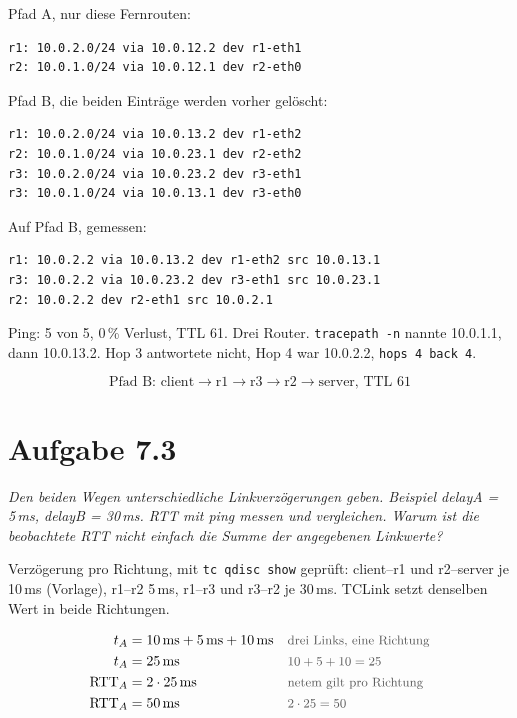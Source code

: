 \documentclass[a4paper,11pt]{article}
\newif\ifexplain
\newcommand{\aufgabe}[1]{\section*{Aufgabe #1}}
\newcommand{\angabe}[1]{{\raggedright\textit{#1}\par}\smallskip}
\newcommand{\why}[1]{\text{\small\color{black!65}#1}}
\newcommand{\explain}[1]{\ifexplain\begin{erklbox}#1\end{erklbox}\fi}
\begin{document}
Pfad A, nur diese Fernrouten:
\begin{lstlisting}
r1: 10.0.2.0/24 via 10.0.12.2 dev r1-eth1
r2: 10.0.1.0/24 via 10.0.12.1 dev r2-eth0
\end{lstlisting}

Pfad B, die beiden Einträge werden vorher gelöscht:
\begin{lstlisting}
r1: 10.0.2.0/24 via 10.0.13.2 dev r1-eth2
r2: 10.0.1.0/24 via 10.0.23.1 dev r2-eth2
r3: 10.0.2.0/24 via 10.0.23.2 dev r3-eth1
r3: 10.0.1.0/24 via 10.0.13.1 dev r3-eth0
\end{lstlisting}

\explain{Zwei statische Routen zum selben Präfix wären ECMP oder eine Metrikwahl. Die Angabe will nur einen aktiven Pfad. Deshalb steht in r1 immer genau ein Eintrag für 10.0.2.0/24. \texttt{ip route del} vor \texttt{replace} räumt einen alten Eintrag weg, falls das Präfix schon da ist.}

Auf Pfad B, gemessen:
\begin{lstlisting}
r1: 10.0.2.2 via 10.0.13.2 dev r1-eth2 src 10.0.13.1
r3: 10.0.2.2 via 10.0.23.2 dev r3-eth1 src 10.0.23.1
r2: 10.0.2.2 dev r2-eth1 src 10.0.2.1
\end{lstlisting}
Ping: 5 von 5, 0\,\% Verlust, TTL 61. Drei Router. \texttt{tracepath -n} nannte 10.0.1.1, dann 10.0.13.2. Hop 3 antwortete nicht, Hop 4 war 10.0.2.2, \texttt{hops 4 back 4}.

\explain{Hop 3 fehlt in der Ausgabe, die TTL nicht. 61 ist 64 minus 3. r2 hat den Probe nicht beantwortet, das Paket ist aber angekommen. Ein einzelner fehlender Hop ist kein Beweis für einen Abbruch, wenn Ping und TTL den dritten Router zeigen.}

\[
\boxed{\text{Pfad B: client}\to\text{r1}\to\text{r3}\to\text{r2}\to\text{server, TTL 61}}
\]

\aufgabe{7.3}
\angabe{Den beiden Wegen unterschiedliche Linkverzögerungen geben. Beispiel delayA = 5\,ms, delayB = 30\,ms. RTT mit ping messen und vergleichen. Warum ist die beobachtete RTT nicht einfach die Summe der angegebenen Linkwerte?}

Verzögerung pro Richtung, mit \texttt{tc qdisc show} geprüft: client--r1 und r2--server je 10\,ms (Vorlage), r1--r2 5\,ms, r1--r3 und r3--r2 je 30\,ms. TCLink setzt denselben Wert in beide Richtungen.

\begin{align*}
t_{A} &= 10\,\mathrm{ms}+5\,\mathrm{ms}+10\,\mathrm{ms} && \why{drei Links, eine Richtung}\\
t_{A} &= 25\,\mathrm{ms} && \why{$10+5+10=25$}\\
\mathrm{RTT}_{A} &= 2\cdot 25\,\mathrm{ms} && \why{netem gilt pro Richtung}\\
\mathrm{RTT}_{A} &= 50\,\mathrm{ms} && \why{$2\cdot 25=50$}
\end{align*}
\end{document}
